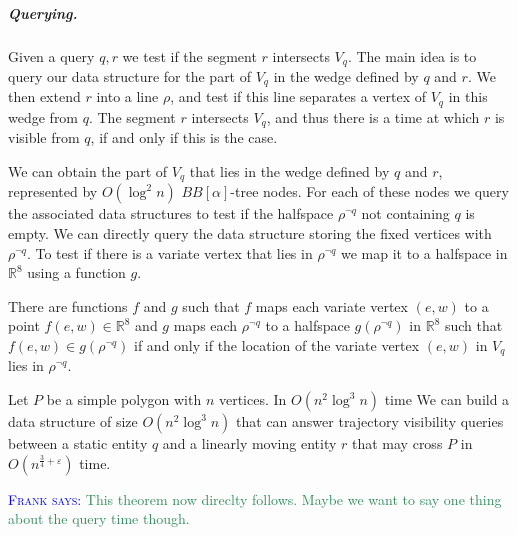 \documentclass[UKenglish]{lipics-v2019}
\newcommand{\myremark}[4]{\textcolor{blue}{\textsc{#1 #2:}} \textcolor{#4}{\textsf{#3}}}
\newcommand{\frank}[2][says]{\myremark{Frank}{#1}{#2}{SeaGreen}}
\newcommand{\eps}{\ensuremath{\varepsilon}\xspace}
\newcommand{\mkmbb}[1]{\ensuremath{\mathbb{#1}}\xspace}
\newcommand{\R}{\mkmbb{R}}
\begin{document}
\subparagraph{Querying.} Given a query $q,r$ we test if the segment $r$
intersects $V_q$. The main idea is to query our data structure for the part of
$V_q$ in the wedge defined by $q$ and $r$. We then extend $r$ into a line $\rho$, and
test if this line separates a vertex of $V_q$ in this wedge from $q$. The
segment $r$ intersects $V_q$, and thus there is a time at which $r$ is visible
from $q$, if and only if this is the case.

We can obtain the part of $V_q$ that lies in the wedge defined by $q$ and $r$,
represented by $O(\log^2 n)$ $BB[\alpha]$-tree nodes. For each of these nodes
we query the associated data structures to test if the halfspace $\rho^{\neg q}$ not
containing $q$ is empty. We can directly query the data structure storing the
fixed vertices with $\rho^{\neg q}$. To test if there is a variate vertex that lies in
$\rho^{\neg q}$ we map it to a halfspace in $\R^8$ using a function $g$.

\begin{lemma}
  \label{lem:query_static}
  There are functions $f$ and $g$ such that $f$ maps each variate vertex
  $(e,w)$ to a point $f(e,w) \in \R^8$ and $g$ maps each $\rho^{\neg q}$ to a
  halfspace $g(\rho^{\neg q})$ in $\R^8$ such that $f(e,w) \in g(\rho^{\neg q})$ if and only
  if the location of the variate vertex $(e,w)$ in $V_q$ lies in $\rho^{\neg q}$.
\end{lemma}

\begin{theorem}
  \label{thm:one_dead_one_ghost}
  Let $P$ be a simple polygon with $n$ vertices. In $O(n^2\log^3 n)$ time We
  can build a data structure of size $O(n^2\log^3 n)$ that can answer
  trajectory visibility queries between a static entity $q$ and a linearly
  moving entity $r$ that may cross $P$ in $O(n^{\frac{3}{4}+\eps})$ time.
\end{theorem}
\frank{This theorem now direclty follows. Maybe we want to say one thing about
  the query time though.}


\end{document}
